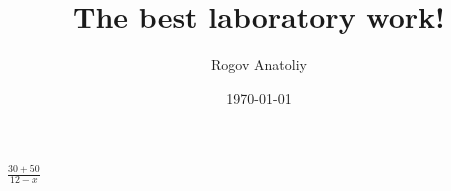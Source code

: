\documentclass[12pt, letterpaper]{article}
\title{The best laboratory work!}
\author{Rogov Anatoliy}
\date{\today}
\begin{document}
\maketitle
$\frac{30+50}{12-x}$
\end{document}
